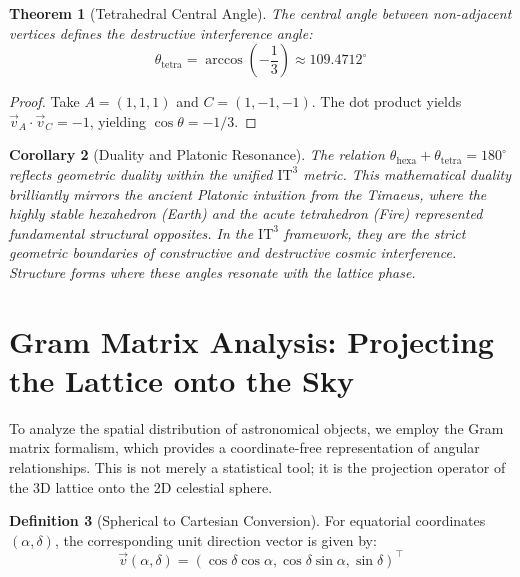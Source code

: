 \documentclass[12pt,a4paper,oneside]{article}
\theoremstyle{plain}
\newtheorem{theorem}{Theorem}[section]
\newtheorem{corollary}[theorem]{Corollary}
\theoremstyle{definition}
\newtheorem{definition}[theorem]{Definition}
\theoremstyle{remark}
\newcommand{\ITthree}{\mathrm{IT}^3}
\begin{document}
\begin{theorem}[Tetrahedral Central Angle]
\label{thm:tetra}
The central angle between non-adjacent vertices defines the destructive interference angle:
\begin{equation}
\boxed{\theta_{\mathrm{tetra}} = \arccos\left(-\frac{1}{3}\right) \approx 109.4712^\circ}
\end{equation}
\end{theorem}
\begin{proof}
Take $A=(1,1,1)$ and $C=(1,-1,-1)$. The dot product yields $\vec{v}_A \cdot \vec{v}_C = -1$, yielding $\cos\theta = -1/3$.
\end{proof}

\begin{corollary}[Duality and Platonic Resonance]
\label{cor:duality}
The relation $\theta_{\mathrm{hexa}} + \theta_{\mathrm{tetra}} = 180^\circ$ reflects geometric duality within the unified \texorpdfstring{$\ITthree$}{IT3} metric. This mathematical duality brilliantly mirrors the ancient Platonic intuition from the \textit{Timaeus}, where the highly stable hexahedron (Earth) and the acute tetrahedron (Fire) represented fundamental structural opposites. In the $\ITthree$ framework, they are the strict geometric boundaries of constructive and destructive cosmic interference. Structure forms where these angles resonate with the lattice phase.
\end{corollary}

\section{Gram Matrix Analysis: Projecting the Lattice onto the Sky}
\label{sec:gram_matrix}

To analyze the spatial distribution of astronomical objects, we employ the Gram matrix formalism, which provides a coordinate-free representation of angular relationships. This is not merely a statistical tool; it is the projection operator of the 3D lattice onto the 2D celestial sphere.

\begin{definition}[Spherical to Cartesian Conversion]
\label{def:spherical}
For equatorial coordinates $(\alpha, \delta)$, the corresponding unit direction vector is given by:
\begin{equation}
\vec{v}(\alpha, \delta) = (\cos\delta \cos\alpha, \cos\delta \sin\alpha, \sin\delta)^\top
\end{equation}
\end{definition}
\end{document}
